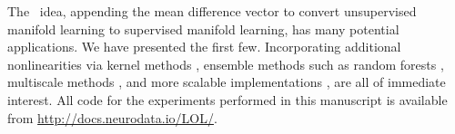 \documentclass[10pt]{article}
\begin{document}




% 
The \Lol~idea, appending the mean difference vector to convert unsupervised manifold learning to supervised manifold learning, has many potential applications.  We have presented the first few.  Incorporating additional nonlinearities via kernel methods \cite{Mika1999a}, ensemble methods such as random forests \cite{Breiman2001a}, multiscale methods \cite{Allard2012},  and more scalable implementations \cite{Chang2011a}, are all of immediate interest. All code for the experiments performed in this manuscript is available from \url{http://docs.neurodata.io/LOL/}.


\clearpage
\end{document}
